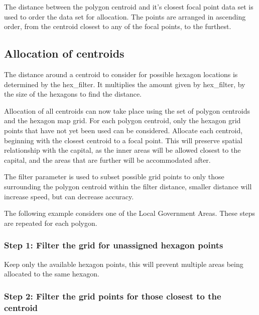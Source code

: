 The distance between the polygon centroid and it's closest focal point
data set is used to order the data set for allocation. The points are
arranged in ascending order, from the centroid closest to any of the
focal points, to the furthest.

\hypertarget{allocation-of-centroids}{%
\subsection{Allocation of centroids}\label{allocation-of-centroids}}

The distance around a centroid to consider for possible hexagon
locations is determined by the hex\_filter. It multiplies the amount
given by hex\_filter, by the size of the hexagons to find the distance.

Allocation of all centroids can now take place using the set of polygon
centroids and the hexagon map grid. For each polygon centroid, only the
hexagon grid points that have not yet been used can be considered.
Allocate each centroid, beginning with the closest centroid to a focal
point. This will preserve spatial relationship with the capital, as the
inner areas will be allowed closest to the capital, and the areas that
are further will be accommodated after.

The filter parameter is used to subset possible grid points to only
those surrounding the polygon centroid within the filter distance,
smaller distance will increase speed, but can decrease accuracy.

The following example considers one of the Local Government Areas. These
steps are repeated for each polygon.

\hypertarget{step-1-filter-the-grid-for-unassigned-hexagon-points}{%
\subsubsection{Step 1: Filter the grid for unassigned hexagon
points}\label{step-1-filter-the-grid-for-unassigned-hexagon-points}}

Keep only the available hexagon points, this will prevent multiple areas
being allocated to the same hexagon.

\hypertarget{step-2-filter-the-grid-points-for-those-closest-to-the-centroid}{%
\subsubsection{Step 2: Filter the grid points for those closest to the
centroid}\label{step-2-filter-the-grid-points-for-those-closest-to-the-centroid}}

